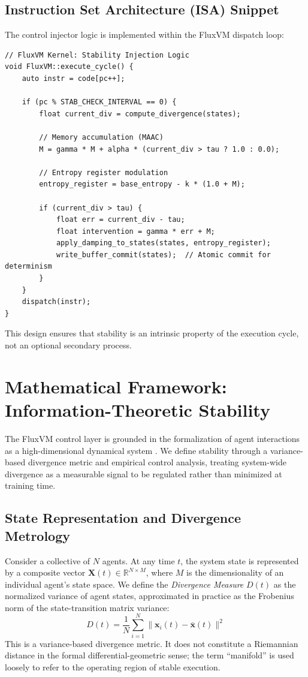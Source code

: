 \documentclass{article}
\begin{document}
\subsection{Instruction Set Architecture (ISA) Snippet}
The control injector logic is implemented within the FluxVM dispatch loop:
\begin{verbatim}
// FluxVM Kernel: Stability Injection Logic
void FluxVM::execute_cycle() {
    auto instr = code[pc++];
    
    if (pc % STAB_CHECK_INTERVAL == 0) {
        float current_div = compute_divergence(states);

        // Memory accumulation (MAAC)
        M = gamma * M + alpha * (current_div > tau ? 1.0 : 0.0);

        // Entropy register modulation
        entropy_register = base_entropy - k * (1.0 + M);

        if (current_div > tau) {
            float err = current_div - tau;
            float intervention = gamma * err + M;
            apply_damping_to_states(states, entropy_register);
            write_buffer_commit(states);  // Atomic commit for determinism
        }
    }
    dispatch(instr);
}
\end{verbatim}
This design ensures that stability is an intrinsic property of the execution cycle, not an optional secondary process.

\newpage

\section{Mathematical Framework: Information-Theoretic Stability}
\label{sec:mathematical_framework}

The FluxVM control layer is grounded in the formalization of agent interactions as a high-dimensional dynamical system \cite{khalil2002nonlinear, sontag1998mathematical}. We define stability through a variance-based divergence metric and empirical control analysis, treating system-wide divergence as a measurable signal to be regulated rather than minimized at training time.

\subsection{State Representation and Divergence Metrology}
Consider a collective of $N$ agents. At any time $t$, the system state is represented by a composite vector $\mathbf{X}(t) \in \mathbb{R}^{N \times M}$, where $M$ is the dimensionality of an individual agent's state space.
We define the \textit{Divergence Measure} $D(t)$ as the normalized variance of agent states, approximated in practice as the Frobenius norm of the state-transition matrix variance:
\begin{equation}
    D(t) = \frac{1}{N} \sum_{i=1}^{N} \|\mathbf{x}_i(t) - \bar{\mathbf{x}}(t)\|^2
\end{equation}
This is a variance-based divergence metric. It does not constitute a Riemannian distance in the formal differential-geometric sense; the term ``manifold'' is used loosely to refer to the operating region of stable execution.
\end{document}
